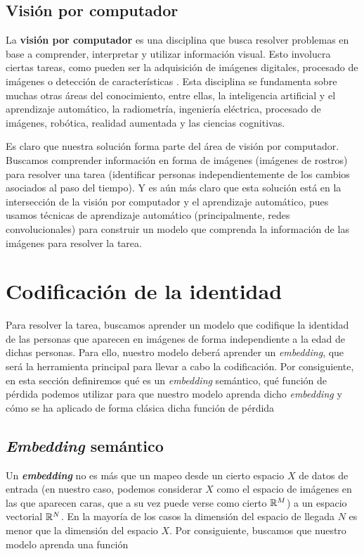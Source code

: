 \subsection{Visión por computador}

La \textbf{visión por computador} es una disciplina que busca resolver problemas en base a comprender, interpretar y utilizar información visual. Esto involucra ciertas tareas, como pueden ser la adquisición de imágenes digitales, procesado de imágenes o detección de características \cite{informatica:cv_modern_approach}. Esta disciplina se fundamenta sobre muchas otras áreas del conocimiento, entre ellas, la inteligencia artificial y el aprendizaje automático, la radiometría, ingeniería eléctrica, procesado de imágenes, robótica, realidad aumentada y las ciencias cognitivas.

Es claro que nuestra solución forma parte del área de visión por computador. Buscamos comprender información en forma de imágenes (imágenes de rostros) para resolver una tarea (identificar personas independientemente de los cambios asociados al paso del tiempo). Y es aún más claro que esta solución está en la intersección de la visión por computador y el aprendizaje automático, pues usamos técnicas de aprendizaje automático (principalmente, redes convolucionales) para construir un modelo que comprenda la información de las imágenes para resolver la tarea.

\section{Codificación de la identidad}

Para resolver la tarea, buscamos aprender un modelo que codifique la identidad de las personas que aparecen en imágenes de forma independiente a la edad de dichas personas. Para ello, nuestro modelo deberá aprender un \textit{embedding}, que será la herramienta principal para llevar a cabo la codificación. Por consiguiente, en esta sección definiremos qué es un \textit{embedding} semántico, qué función de pérdida podemos utilizar para que nuestro modelo aprenda dicho \textit{embedding} y cómo se ha aplicado de forma clásica dicha función de pérdida

\subsection{\textit{Embedding} semántico} \label{isec:embeddings}

Un \textbf{\textit{embedding}} no es más que un mapeo desde un cierto espacio $X$ de datos de entrada (en nuestro caso, podemos considerar $X$ como el espacio de imágenes en las que aparecen caras, que a su vez puede verse como cierto $\mathbb{R}^M$) a un espacio vectorial $\mathbb{R}^N$. En la mayoría de los casos la dimensión del espacio de llegada $N$ es menor que la dimensión del espacio $X$. Por consiguiente, buscamos que nuestro modelo aprenda una función

